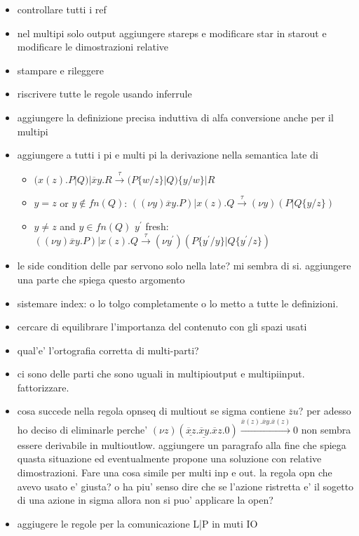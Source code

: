 \begin{itemize}
  \item 
    controllare tutti i ref
  \item 
    nel multipi solo output aggiungere stareps e modificare star in starout e modificare le dimostrazioni relative 
  \item 	
    stampare e rileggere
  \item
    riscrivere tutte le regole usando inferrule
  \item
    aggiungere la definizione precisa induttiva di alfa conversione anche per il multipi
  \item
    aggiungere a tutti i pi e multi pi la derivazione nella semantica late di
    \begin{itemize}
      \item 
	$(x(z).P|Q)|\overline{x}y.R \xrightarrow{\tau} (P\{w/z\}|Q)\{y/w\}|R$ 
      \item
	$y=z$ or $y\notin fn(Q)$: $((\nu y) \overline{x}y.P)| x(z).Q \xrightarrow{\tau} (\nu y)(P|Q\{y/z\})$
      \item
	$y\neq z$ and $y\in fn(Q)$  $y^{'}$ fresh: $((\nu y) \overline{x}y.P)| x(z).Q \xrightarrow{\tau} (\nu y^{'})(P\{y^{'}/y\}|Q\{y^{'}/z\})$
    \end{itemize}
  \item	
    le side condition delle par servono solo nella late? mi sembra di si. aggiungere una parte che spiega questo argomento
  \item
    sistemare index: o lo tolgo completamente o lo metto a tutte le definizioni.
  \item	
    cercare di equilibrare l'importanza del contenuto con gli spazi usati
  \item	
    qual'e' l'ortografia corretta di multi-parti?
  \item	
    ci sono delle parti che sono uguali in multipioutput e multipiinput. fattorizzare.
  \item	
    cosa succede nella regola opnseq di multiout se sigma contiene $\overline{z}u$? per adesso ho deciso di eliminarle perche' $(\nu z)(\underline{\overline{x}z}.\underline{\overline{x}y}.\overline{x}z.0) \xrightarrow{\overline{x}(z).\overline{x}y.\overline{x}(z)} 0$ non sembra essere derivabile in multioutlow. aggiungere un paragrafo alla fine che spiega quasta situazione ed eventualmente propone una soluzione con relative dimostrazioni. Fare una cosa simile per multi inp e out.
    la regola opn che avevo usato e' giusta? o ha piu' senso dire che se l'azione ristretta e' il sogetto di una azione in sigma allora non si puo' applicare la open?
  \item
    aggiugere le regole per la comunicazione L|P in muti IO
\end{itemize}

